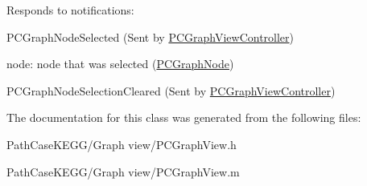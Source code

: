 Responds to notifications:


\begin{DoxyItemize}
\item PCGraphNodeSelected (Sent by \hyperlink{interface_p_c_graph_view_controller}{PCGraphViewController})
\begin{DoxyItemize}
\item node: node that was selected (\hyperlink{interface_p_c_graph_node}{PCGraphNode})
\end{DoxyItemize}
\end{DoxyItemize}


\begin{DoxyItemize}
\item PCGraphNodeSelectionCleared (Sent by \hyperlink{interface_p_c_graph_view_controller}{PCGraphViewController}) 
\end{DoxyItemize}

The documentation for this class was generated from the following files:\begin{DoxyCompactItemize}
\item 
PathCaseKEGG/Graph view/PCGraphView.h\item 
PathCaseKEGG/Graph view/PCGraphView.m\end{DoxyCompactItemize}

